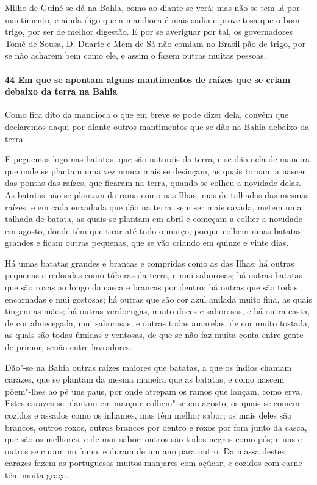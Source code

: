 Milho de Guiné se dá na Bahia, como ao diante se verá; mas não se tem lá por mantimento, e
ainda digo que a mandioca é mais sadia e proveitosa que o bom trigo, por ser de melhor
digestão. E por se averiguar por tal, os governadores Tomé de Sousa, D. Duarte e Mem de Sá
não comiam no Brasil pão de trigo, por se não acharem bem como ele, e assim o fazem outras
muitas pessoas.

\paragraph{44 Em que se apontam alguns mantimentos de raízes que se criam debaixo da terra
na Bahia}

Como fica dito da mandioca o que em breve se pode dizer dela, convém que declaremos daqui
por diante outros mantimentos que se dão na Bahia debaixo da terra.

E peguemos logo nas batatas, que são naturais da terra, e se dão nela de maneira que onde
se plantam uma vez nunca mais se desinçam, as quais tornam a nascer das pontas das raízes,
que ficaram na terra, quando se colheu a novidade delas. As batatas não se plantam da rama
como nas Ilhas, mas de talhadas das mesmas raízes, e em cada enxadada que dão na terra,
sem ser mais cavada, metem uma talhada de batata, as quais se plantam em abril e começam a
colher a novidade em agosto, donde têm que tirar até todo o março, porque colhem umas
batatas grandes e ficam outras pequenas, que se vão criando em quinze e vinte dias.

Há umas batatas grandes e brancas e compridas como as das Ilhas; há outras pequenas e
redondas como túberas da terra, e mui saborosas; há outras batatas que são roxas ao longo
da casca e brancas por dentro; há outras que são todas encarnadas e mui gostosas; há
outras que são cor azul anilada muito fina, as quais tingem as mãos; há outras verdoengas,
muito doces e saborosas; e há outra casta, de cor almecegada, mui saborosas; e outras
todas amarelas, de cor muito tostada, as quais são todas úmidas e ventosas, de que se não
faz muita conta entre gente de primor, senão entre lavradores.

Dão"-se na Bahia outras raízes maiores que batatas, a que os índios chamam carazes, que se
plantam da mesma maneira que as batatas, e como nascem põem"-lhes ao pé uns paus, por onde
atrepam os ramos que lançam, como erva. Estes carazes se plantam em março e colhem"-se em
agosto, os quais se comem cozidos e assados como os inhames, mas têm melhor sabor; os mais
deles são brancos, outros roxos, outros brancos por dentro e roxos por fora junto da
casca, que são os melhores, e de mor sabor; outros são todos negros como pós; e uns e
outros se curam no fumo, e duram de um ano para outro. Da massa destes carazes fazem as
portuguesas muitos manjares com açúcar, e cozidos com carne têm muita graça.

